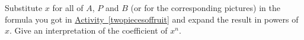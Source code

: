 \documentclass{book}
\begin{document}
\setcounter{project}{237}
\addtocounter{project}{-1}
\begin{activity}[]\label{activity-230}
\hypertarget{p-1299}{}%
Substitute \(x\) for all of \(A\), \(P\) and \(B\) (or for the corresponding pictures) in the formula you got in \hyperref[twopiecesoffruit]{Activity~\ref{twopiecesoffruit}} and expand the result in powers of \(x\). Give an interpretation of the coefficient of \(x^n\).%
\end{activity}
\end{document}
